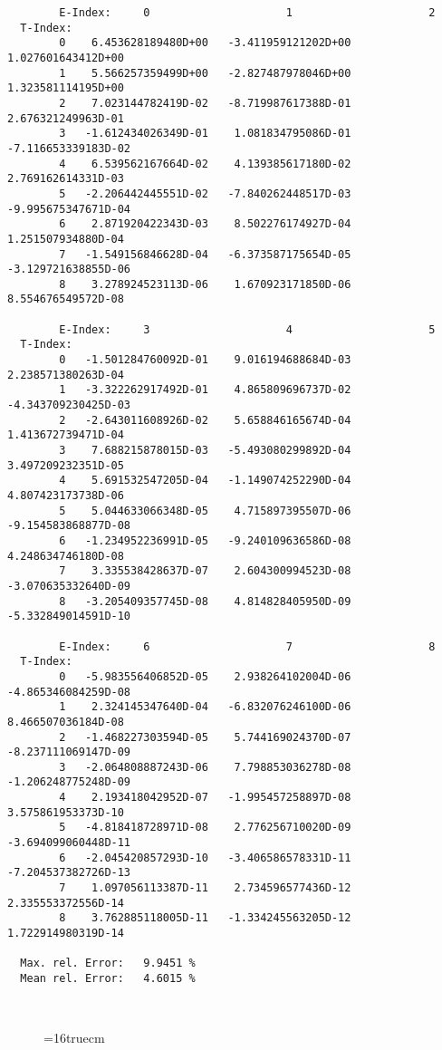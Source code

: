 \documentclass[12pt]{article}
\begin{document}
\begin{small}\begin{verbatim}
        E-Index:     0                     1                     2
  T-Index:
        0    6.453628189480D+00   -3.411959121202D+00    1.027601643412D+00
        1    5.566257359499D+00   -2.827487978046D+00    1.323581114195D+00
        2    7.023144782419D-02   -8.719987617388D-01    2.676321249963D-01
        3   -1.612434026349D-01    1.081834795086D-01   -7.116653339183D-02
        4    6.539562167664D-02    4.139385617180D-02    2.769162614331D-03
        5   -2.206442445551D-02   -7.840262448517D-03   -9.995675347671D-04
        6    2.871920422343D-03    8.502276174927D-04    1.251507934880D-04
        7   -1.549156846628D-04   -6.373587175654D-05   -3.129721638855D-06
        8    3.278924523113D-06    1.670923171850D-06    8.554676549572D-08

        E-Index:     3                     4                     5
  T-Index:
        0   -1.501284760092D-01    9.016194688684D-03    2.238571380263D-04
        1   -3.322262917492D-01    4.865809696737D-02   -4.343709230425D-03
        2   -2.643011608926D-02    5.658846165674D-04    1.413672739471D-04
        3    7.688215878015D-03   -5.493080299892D-04    3.497209232351D-05
        4    5.691532547205D-04   -1.149074252290D-04    4.807423173738D-06
        5    5.044633066348D-05    4.715897395507D-06   -9.154583868877D-08
        6   -1.234952236991D-05   -9.240109636586D-08    4.248634746180D-08
        7    3.335538428637D-07    2.604300994523D-08   -3.070635332640D-09
        8   -3.205409357745D-08    4.814828405950D-09   -5.332849014591D-10

        E-Index:     6                     7                     8
  T-Index:
        0   -5.983556406852D-05    2.938264102004D-06   -4.865346084259D-08
        1    2.324145347640D-04   -6.832076246100D-06    8.466507036184D-08
        2   -1.468227303594D-05    5.744169024370D-07   -8.237111069147D-09
        3   -2.064808887243D-06    7.798853036278D-08   -1.206248775248D-09
        4    2.193418042952D-07   -1.995457258897D-08    3.575861953373D-10
        5   -4.818418728971D-08    2.776256710020D-09   -3.694099060448D-11
        6   -2.045420857293D-10   -3.406586578331D-11   -7.204537382726D-13
        7    1.097056113387D-11    2.734596577436D-12    2.335553372556D-14
        8    3.762885118005D-11   -1.334245563205D-12    1.722914980319D-14

  Max. rel. Error:   9.9451 %
  Mean rel. Error:   4.6015 %



\end{verbatim}\end{small}
\begin{figure} \label{2.3.6lr1}
\epsfxsize=16truecm
\end{figure}
\newpage
\end{document}
